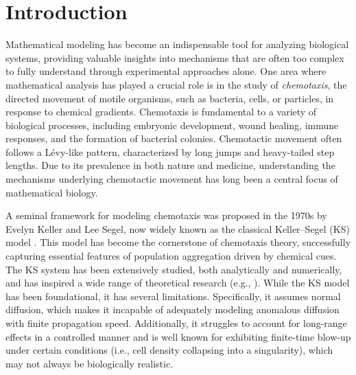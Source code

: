 \documentclass{article}
\begin{document}
\section{Introduction}
Mathematical modeling has become an indispensable tool for analyzing biological systems, providing valuable insights into mechanisms that are often too complex to fully understand through experimental approaches alone. One area where mathematical analysis has played a crucial role is in the study of \textit{chemotaxis}, the directed movement of motile organisms, such as bacteria, cells, or particles, in response to chemical gradients. Chemotaxis is fundamental to a variety of biological processes, including embryonic development, wound healing, immune responses, and the formation of bacterial colonies. Chemotactic movement often follows a  L\'{e}vy-like pattern, characterized by long jumps and heavy-tailed step lengths. Due to its prevalence in both nature and medicine, understanding the mechanisms underlying chemotactic movement has long been a central focus of mathematical biology.


A seminal framework for modeling chemotaxis was proposed in the 1970s by Evelyn Keller and Lee Segel, now widely known as the classical Keller--Segel (KS) model \cite{KellerSegel1970}. 
This model has become the cornerstone of chemotaxis theory, successfully capturing essential features of population aggregation driven by chemical cues. The KS system has been extensively studied, both analytically and numerically, and has inspired a wide range of theoretical research (e.g., \cite{Osaki2001,Ryu2001}). While the KS model has been foundational, it has several limitations. Specifically, it assumes normal diffusion, which makes it incapable of adequately modeling anomalous diffusion with finite propagation speed. Additionally, it struggles to account for long-range effects in a controlled manner and is well known for exhibiting finite-time blow-up under certain conditions (i.e., cell density collapsing into a singularity), which may not always be biologically realistic.
\end{document}
